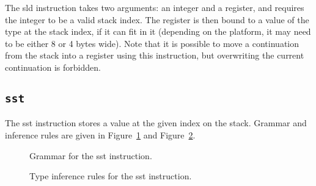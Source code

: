 The {\Iformat sld} instruction takes two arguments: an integer and a register, and requires the integer to be a valid stack index.
The register is then bound to a value of the type at the stack index, if it can fit in it (depending on the platform, it may need to be either 8 or 4 bytes wide).
Note that it is possible to move a continuation from the stack into a register using this instruction, but overwriting the current continuation is forbidden.

\subsection{\texttt{sst}}\label{subsec:nstar-instructionset-stack-sst}

The {\Iformat sst} instruction stores a value at the given index on the stack.
Grammar and inference rules are given in Figure~\ref{fig:nstar-instructionset-stack-sst-grammar} and Figure~\ref{fig:nstar-instructionset-stack-sst-typerules}.

\begin{figure}[H]
	\centering


	\caption{Grammar for the {\Iformat sst} instruction.}
	\label{fig:nstar-instructionset-stack-sst-grammar}
\end{figure}

\begin{figure}[H]
	\centering



	\caption{Type inference rules for the {\Iformat sst} instruction.}
	\label{fig:nstar-instructionset-stack-sst-typerules}
\end{figure}

